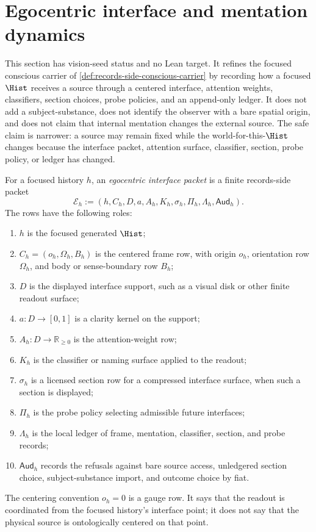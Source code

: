 \section{Egocentric interface and mentation dynamics}
\label{sec:egocentric-interface-mentation-dynamics}

\begin{remark}
\label{rem:egocentric-interface-mentation-vision-seed-status}
This section has vision-seed status and no Lean target. It refines the
focused conscious carrier of \autoref{def:records-side-conscious-carrier}
by recording how a focused $\Hist$ receives a source through a centered
interface, attention weights, classifiers, section choices, probe
policies, and an append-only ledger. It does not add a subject-substance,
does not identify the observer with a bare spatial origin, and does not
claim that internal mentation changes the external source. The safe
claim is narrower: a source may remain fixed while the world-for-this-$\Hist$
changes because the interface packet, attention surface, classifier,
section, probe policy, or ledger has changed.
\end{remark}

\begin{definition}
\label{def:egocentric-interface-packet}
For a focused history $h$, an \emph{egocentric interface packet} is a
finite records-side packet
$$
\mathcal E_h
:=
(h,C_h,D,a,A_h,K_h,\sigma_h,\Pi_h,\Lambda_h,\mathsf{Aud}_h).
$$
The rows have the following roles:
\begin{enumerate}
\item $h$ is the focused generated $\Hist$;
\item $C_h=(o_h,\Omega_h,B_h)$ is the centered frame row, with origin
$o_h$, orientation row $\Omega_h$, and body or sense-boundary row $B_h$;
\item $D$ is the displayed interface support, such as a visual disk or
other finite readout surface;
\item $a:D\to[0,1]$ is a clarity kernel on the support;
\item $A_h:D\to\mathbb R_{\ge 0}$ is the attention-weight row;
\item $K_h$ is the classifier or naming surface applied to the readout;
\item $\sigma_h$ is a licensed section row for a compressed interface
surface, when such a section is displayed;
\item $\Pi_h$ is the probe policy selecting admissible future interfaces;
\item $\Lambda_h$ is the local ledger of frame, mentation, classifier,
section, and probe records;
\item $\mathsf{Aud}_h$ records the refusals against bare source access,
unledgered section choice, subject-substance import, and outcome choice by
fiat.
\end{enumerate}
The centering convention $o_h=0$ is a gauge row. It says that the readout
is coordinated from the focused history's interface point; it does not say
that the physical source is ontologically centered on that point.
\end{definition}

